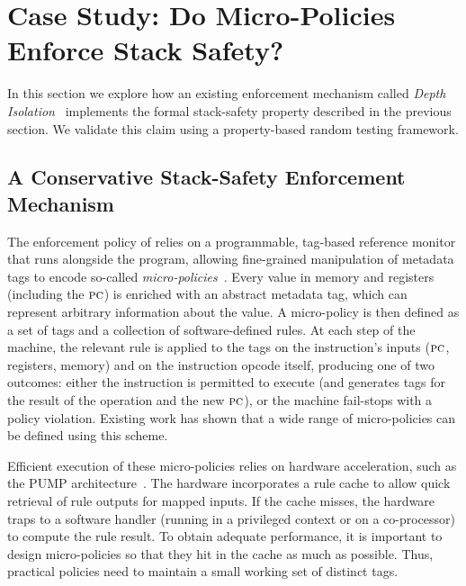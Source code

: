 \documentclass[acmsmall,review,anonymous]{acmart}\settopmatter{printfolios=true,printccs=false,printacmref=false}
\begin{document}
{{\section{Case Study: Do Micro-Policies Enforce Stack Safety?}
\label{sec:enforcement}

In this section we explore how an existing enforcement mechanism called {\em
  Depth Isolation}~\citep{DBLP:conf/sp/RoesslerD18} implements
the formal stack-safety property described in the previous
section. We validate this claim
using a property-based random testing framework.

\subsection{A Conservative Stack-Safety Enforcement Mechanism}
%
The enforcement policy of \citeauthor{DBLP:conf/sp/RoesslerD18} relies
on a programmable, tag-based reference monitor that runs alongside the
program,
allowing fine-grained manipulation of metadata tags to encode so-called
\emph{micro-policies}~\citep{pump_oakland2015}.
Every value in
memory and registers (including the $\textsc{pc}$)
is enriched with an abstract metadata tag, which can represent
arbitrary information about the value. A micro-policy is then defined as a
set of tags and a
collection of software-defined rules.
At each step of the machine, the relevant rule is applied to the tags on
the instruction's inputs ($\textsc{pc}$, registers, memory) and on the
instruction opcode itself, producing
one of two outcomes: either the instruction is permitted to execute (and
generates tags for the result of the operation and the new $\textsc{pc}$), or
the machine fail-stops with a policy violation.
Existing work \citep{TestingNI:ICFP,pump_oakland2015, DBLP:conf/sp/RoesslerD18}
has shown that a wide range of
micro-policies can be defined using this scheme.

Efficient execution of these micro-policies relies on hardware acceleration,
such as the PUMP architecture~\citep{pump:asplos2015}.
The hardware incorporates a rule cache
to allow quick retrieval of rule outputs for mapped inputs. If the cache misses,
the hardware traps to a software handler (running in a privileged context or
on a co-processor) to compute the rule result. To obtain adequate performance,
it is important to design micro-policies so that they hit in the cache as
much as possible. Thus, practical policies need to maintain a small working
set of distinct tags.

}}
\end{document}
